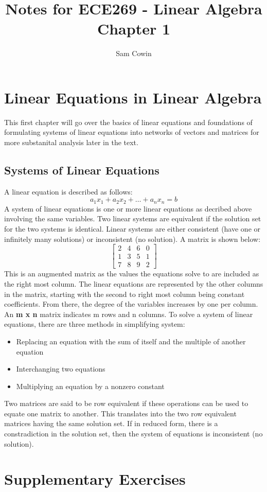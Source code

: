 \documentclass[12pt]{article}
\begin{document}
\title{Notes for ECE269 - Linear Algebra \\
\large Chapter 1}
\author{Sam Cowin}

\maketitle

\section{Linear Equations in Linear Algebra}
This first chapter will go over the basics of linear equations and foundations of formulating systems of linear equations %
into networks of vectors and matrices for more substanital analysis later in the text.

\subsection{Systems of Linear Equations}
A linear equation is described as follows:
\begin{equation}
    a_1x_1 + a_2x_2 + \dots + a_nx_n = b
\end{equation}
A system of linear equations is one or more linear equations as decribed above involving the same variables. %
Two linear systems are equivalent if the solution set for the two systems is identical. Linear systems are either %
consistent (have one or infinitely many solutions) or inconsistent (no solution).
\newline
\newline
\noindent A matrix is shown below:
$$
\begin{bmatrix}
    2 & 4 & 6 & 0 \\
    1 & 3 & 5 & 1 \\
    7 & 8 & 9 & 2
\end{bmatrix}
$$
\newline
This is an augmented matrix as the values the equations solve to are included as the right most column. The linear equations are represented%
 by the other columns in the matrix, starting with the second to right most column being constant coefficients. From there, the degree of the variables%
 increases by one per column. An \textbf{m x n} matrix indicates m rows and n columns. 
\newline
\newline
To solve a system of linear equations, there are three methods in simplifying system:
\begin{itemize}
    \item Replacing an equation with the sum of itself and the multiple of another equation
    \item Interchanging two equations
    \item Multiplying an equation by a nonzero constant
\end{itemize}
Two matrices are said to be row equivalent if these operations can be used to equate one matrix to another. This translates into the two row equivalent matrices %
having the same solution set. If in reduced form, there is a constradiction in the solution set, then the system of equations is inconsistent (no solution). 

\section{Supplementary Exercises}
\end{document}
